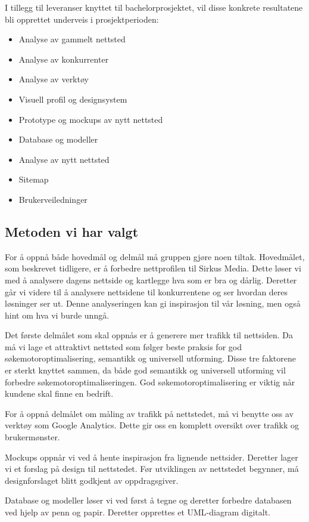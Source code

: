 I tillegg til leveranser knyttet til bachelorprosjektet, vil disse konkrete resultatene bli opprettet underveis i prosjektperioden:
\begin{itemize}
\item Analyse av gammelt nettsted
\item Analyse av konkurrenter
\item Analyse av verktøy
\item Visuell profil og designsystem
\item Prototype og mockups av nytt nettsted
\item Database og modeller
\item Analyse av nytt nettsted
\item Sitemap
\item Brukerveiledninger
\end{itemize}

\subsection{Metoden vi har valgt}
\label{sec:metode}
For å oppnå både hovedmål og delmål må gruppen gjøre noen tiltak. Hovedmålet, som beskrevet tidligere, er å forbedre nettprofilen til Sirkus Media. Dette løser vi med å analysere dagens nettside og kartlegge hva som er bra og dårlig. Deretter går vi videre til å analysere nettsidene til konkurrentene og ser hvordan deres løsninger ser ut. Denne analyseringen kan gi inspirasjon til vår løsning, men også hint om hva vi burde unngå.

Det første delmålet som skal oppnås er å generere mer trafikk til nettsiden. Da må vi lage et attraktivt nettsted som følger beste praksis for god søkemotoroptimalisering, semantikk og universell utforming. Disse tre faktorene er sterkt knyttet sammen, da både god semantikk og universell utforming vil forbedre søkemotoroptimaliseringen. God søkemotoroptimalisering er viktig når kundene skal finne en bedrift.

For å oppnå delmålet om måling av trafikk på nettstedet, må vi benytte oss av verktøy som Google Analytics. Dette gir oss en komplett oversikt over trafikk og brukermønster.

Mockups oppnår vi ved å hente inspirasjon fra lignende nettsider. Deretter lager vi et forslag på design til nettstedet. Før utviklingen av nettstedet begynner, må designforslaget blitt godkjent av oppdragsgiver.

Database og modeller løser vi ved først å tegne og deretter forbedre databasen ved hjelp av penn og papir. Deretter opprettes et UML-diagram digitalt.

